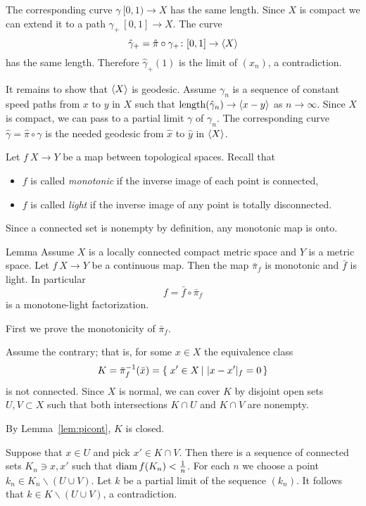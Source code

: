 \documentclass{article}
\begin{document}
The corresponding curve $\gamma\:[0,1)\to X$ has the same length.
Since $X$ is compact we can extend it to a path $\gamma_+\:[0,1]\to X$.
The curve 
\[\hat\gamma_+=\hat\pi\circ\gamma_+\colon[0,1]\to\langle X\rangle\]
has the same length.
Therefore $\hat\gamma_+(1)$ is the limit of $(x_n)$, a contradiction.

It remains to show that $\langle X\rangle$ is geodesic.
Assume $\gamma_n$ is a sequence of constant speed paths from $x$ to $y$ in $X$
such that $\mathop{\rm length}\nolimits(\hat\gamma_n)\to \langle x-y\rangle$ as $n\to\infty$.
Since $X$ is compact, we can pass to a partial limit $\gamma$ of  $\gamma_n$.
The corresponding curve $\hat\gamma=\hat \pi\circ\gamma$ is the needed geodesic from $\hat x$ to $\hat y$ in $\langle X\rangle$.
\qeds

Let $f\:X\to Y$ be a map between topological spaces.
Recall that 
\begin{itemize}
\item $f$ is called \emph{monotonic} if the inverse image of each point is connected,
 \item $f$ is called \emph{light} if the inverse image of any point is totally disconnected.
\end{itemize}
Since a connected set is nonempty by definition, any monotonic map is onto.

\begin{thm}{Lemma}\label{cor:fiberconnected}
Assume $X$ is a locally connected compact metric space and $Y$ is a metric space.
Let $f\:X\to Y$ be a continuous map.
Then the map $\bar \pi_f$ is monotonic and $\bar f$ is light.
In particular 
\[f=\bar f\circ\bar\pi_f\]
is a monotone-light factorization. 
\end{thm}

First we prove the monotonicity of $\bar\pi_f$.

Assume the contrary;
that is, for some $x\in X$ the equivalence class 
\[K=\bar\pi_f^{-1}(\bar x)=\set{x'\in X}{|x-x'|_f=0}\]
is not connected. Since $X$ is normal, we
can cover $K$ by disjoint open sets $U,V\subset X$ such that both intersections
$K\cap U$ and $K\cap V$ are nonempty.

By Lemma~\ref{lem:picont}, $K$ is closed.

Suppose that $x\in U$ and pick $x'\in K\cap V$.
Then there is a sequence of connected sets $K_n\ni x,x'$ such that $\mathop{\rm diam}\nolimits f(K_n)<\tfrac1n$.
For each $n$ we choose a point $k_n\in K_n\backslash (U\cup V)$.
Let $k$ be a partial limit of the sequence $(k_n)$.
It follows that $k\in K\backslash (U\cup V)$, a contradiction. 
\end{document}
